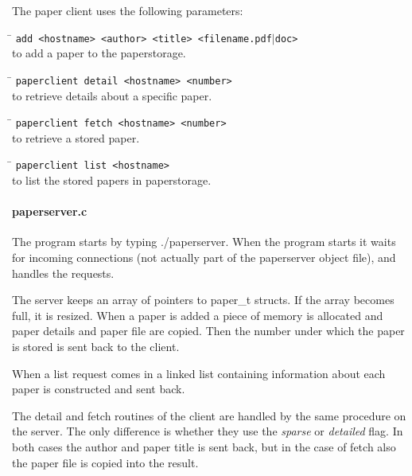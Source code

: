 \documentclass[a4paper,10pt]{article}
\begin{document}
The paper client uses the following parameters:

\begin{tabbing}
\hspace{20pt}\=\kill
 \> \texttt{add <hostname> <author> <title> <filename.}{\texttt{pdf$\vert$doc}}\texttt{>} \\
 \> to add a paper to the paperstorage.
\end{tabbing}

\begin{tabbing}
\hspace{20pt}\=\kill
 \> \texttt{paperclient detail <hostname> <number>} \\
 \> to retrieve details about a specific paper.
\end{tabbing}

\begin{tabbing}
\hspace{20pt}\=\kill
 \> \texttt{paperclient fetch <hostname> <number>} \\
 \> to retrieve a stored paper.
\end{tabbing}

\begin{tabbing}
\hspace{20pt}\=\kill
 \> \texttt{paperclient list <hostname>} \\
 \> to list the stored papers in paperstorage.
\end{tabbing}

\paragraph{paperserver.c}
The program starts by typing ./paperserver. When the program starts it waits for incoming connections (not actually part of the paperserver object file), and handles the requests.

The server keeps an array of pointers to paper\_t structs. If the array becomes full, it is resized. When a paper is added a piece of memory is allocated and paper details and paper file are copied. Then the number under which the paper is stored is sent back to the client.

When a list request comes in a linked list containing information about each paper is constructed and sent back.

The detail and fetch routines of the client are handled by the same procedure on the server. The only difference is whether they use the \emph{sparse} or \emph{detailed} flag. In both cases the author and paper title is sent back, but in the case of fetch also the paper file is copied into the result.
\end{document}
